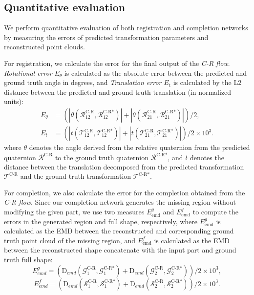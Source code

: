\subsection{Quantitative evaluation} \label{sec:quantitative}

We perform quantitative evaluation of both registration and completion networks by measuring the errors of predicted transformation parameters and reconstructed point clouds.

For registration, we calculate the error for the final output of the \textit{C-R flow}. \textit{Rotational error} $E_{\theta}$ is calculated as the absolute error between the predicted and ground truth angle in degrees, and \textit{Translation error} $E_{\text{t}}$ is calculated by the L2 distance between the predicted and ground truth translation (in normalized units):
\begin{align}
E_{\theta} &= \left(|\theta(\mathcal{R}_{12}^{\text{C-R}}, \mathcal{R}_{12}^{\text{C-R}*})| + |\theta(\mathcal{R}_{21}^{\text{C-R}}, \mathcal{R}_{21}^{\text{C-R}*})|\right) / 2,  \\ 
E_{t} &= \left(|t(\mathcal{T}_{12}^{\text{C-R}}, \mathcal{T}_{12}^{\text{C-R}*})| + |t(\mathcal{T}_{21}^{\text{C-R}}, \mathcal{T}_{21}^{\text{C-R}*})|\right) / 2 \times 10^3. 
\end{align}
where $\theta$ denotes the angle derived from the relative quaternion from the predicted quaternion $\mathcal{R}^{\text{C-R}}$ to the ground truth quaternion $\mathcal{R}^{\text{C-R}*}$, and $t$ denotes the distance between the translation decomposed from the predicted transformation $\mathcal{T}^{\text{C-R}}$ and the ground truth transformation $\mathcal{T}^{\text{C-R}*}$.

For completion, we also calculate the error for the completion obtained from the \textit{C-R flow}.
Since our completion network generates the missing region without modifying the given part, we use two measures $E_{\text{emd}}^g$ and $E_{\text{emd}}^f$ to compute the errors in the generated region and full shape, respectively, where $E_{\text{emd}}^g$ is calculated as the EMD between the reconstructed and corresponding ground truth point cloud of the missing region, and  $E_{\text{emd}}^f$ is calculated as the EMD between the reconstructed shape concatenate with the input part and ground truth full shape:
\begin{equation}
E_{emd}^g = \left(\text{D}_{emd}(\mathcal{G}_{1}^{\text{C-R}}, \mathcal{G}_{1}^{\text{C-R}*}) + \text{D}_{emd}(\mathcal{G}_{2}^{\text{C-R}}, \mathcal{G}_{2}^{\text{C-R}*})\right) / 2 \times 10^3, \label{compeval1}
\end{equation}
\begin{equation}
E_{emd}^f = \left(\text{D}_{emd}(\mathcal{S}_{1}^{\text{C-R}} , \mathcal{S}_{1}^{\text{C-R}*} ) + \text{D}_{emd}(\mathcal{S}_{2}^{\text{C-R}} , \mathcal{S}_{2}^{\text{C-R}*})\right) / 2 \times 10^3. \label{compeval2}
\end{equation}

